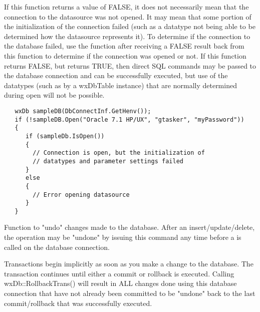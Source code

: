 If this function returns a value of FALSE, it does not necessarily mean that
the connection to the datasource was not opened.  It may mean that some
portion of the initialization of the connection failed (such as a datatype not
being able to be determined how the datasource represents it).  To determine
if the connection to the database failed, use the 
function after receiving a FALSE result back from this function to determine if
the connection was opened or not.  If this function returns FALSE, but 
returns TRUE, then direct SQL commands may be passed to the database
connection and can be successfully executed, but use of the datatypes (such as
by a wxDbTable instance) that are normally determined during open will not be
possible.



\begin{verbatim}
   wxDb sampleDB(DbConnectInf.GetHenv());
   if (!sampleDB.Open("Oracle 7.1 HP/UX", "gtasker", "myPassword"))
   {
      if (sampleDb.IsOpen())
      {
        // Connection is open, but the initialization of
        // datatypes and parameter settings failed
      }
      else
      {
        // Error opening datasource
      }
   }
\end{verbatim}

\label{wxdbrollbacktrans}


Function to "undo" changes made to the database.  After an insert/update/delete, the operation may be "undone" by issuing this command any time before a  is called on the database connection.


Transactions begin implicitly as soon as you make a change to the database.  The
transaction continues until either a commit or rollback is executed.  Calling
wxDb::RollbackTrans() will result in ALL changes done using this database
connection that have not already been committed to be "undone" back to the last
commit/rollback that was successfully executed.

